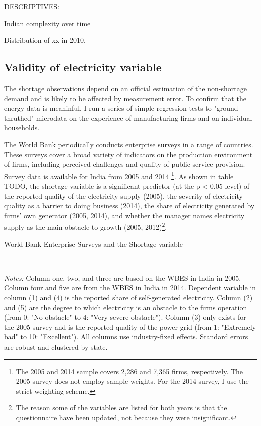 \documentclass[11pt]{article}
\begin{document}
DESCRIPTIVES:

Indian complexity over time

Distribution of xx in 2010. 

\subsection{Validity of electricity variable}%
\label{sub:validity_of_electricity_variable}

The shortage observations depend on an official estimation of the non-shortage demand and is likely to be affected by measurement error. To confirm that the energy data is meaninful, I run a series of simple regression tests to "ground thruthed" microdata on the experience of manufacturing firms and on individual households. 

The World Bank periodically conducts enterprise surveys in a range of countries. These surveys cover a broad variety of indicators on the production environment of firms, including perceived challenges and quality of public service provision. Survey data is available for India from 2005 and 2014 \citep{world_bank_enterprise_2020-1,world_bank_enterprise_2020-2}\footnote{The 2005 and 2014 sample covers 2,286 and 7,365 firms, respectively. The 2005 survey does not employ sample weights. For the 2014 survey, I use the strict weighting scheme.}. As shown in table TODO, the shortage variable is a significant predictor (at the p < 0.05 level) of the reported quality of the electricity supply (2005), the severity of electricity quality as a barrier to doing business (2014), the share of electricity generated by firms' own generator (2005, 2014), and whether the manager names electricity supply as the main obstacle to growth (2005, 2012)\footnote{The reason some of the variables are listed for both years is that the questionnaire have been updated, not because they were insignificant.}.

\begin{table}
    \caption{World Bank Enterprise Surveys and the Shortage variable}
    \label{tab:wbes}
    \begin{minipage}{0.95\textwidth} 

    \\
    { \footnotesize \textit{Notes:} Column one, two, and three are based on the WBES in India in 2005. Column four and five are from the WBES in India in 2014. Dependent variable in column (1) and (4) is the reported share of self-generated electricity. Column (2) and (5) are the degree to which electricity is an obstacle to the firms operation (from 0: "No obstacle" to 4: "Very severe obstacle"). Column (3) only exists for the 2005-survey and is the reported quality of the power grid (from 1: "Extremely bad" to 10: "Excellent"). All columns use industry-fixed effects. Standard errors are robust and clustered by state. \\
\par}
    \end{minipage}
\end{table}   
\end{document}
